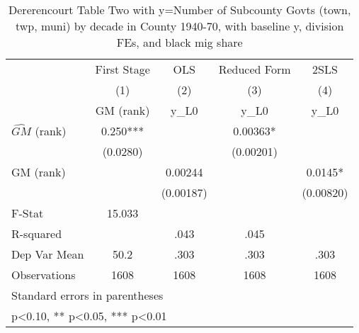 \begin{table}[htbp]\centering
\def\sym#1{\ifmmode^{#1}\else\(^{#1}\)\fi}
\caption{Dererencourt Table Two with y=Number of Subcounty Govts (town, twp, muni) by decade in County 1940-70, with baseline y, division FEs, and black mig share}
\begin{tabular}{l*{4}{c}}
\toprule
                    & First Stage   &         OLS   &Reduced Form   &        2SLS   \\
                    &\multicolumn{1}{c}{(1)}&\multicolumn{1}{c}{(2)}&\multicolumn{1}{c}{(3)}&\multicolumn{1}{c}{(4)}\\
                    &\multicolumn{1}{c}{GM  (rank)}&\multicolumn{1}{c}{y\_L0}&\multicolumn{1}{c}{y\_L0}&\multicolumn{1}{c}{y\_L0}\\
\midrule
$\hat{GM}$ (rank)   &       0.250***&               &     0.00363*  &               \\
                    &    (0.0280)   &               &   (0.00201)   &               \\
\addlinespace
GM  (rank)          &               &     0.00244   &               &      0.0145*  \\
                    &               &   (0.00187)   &               &   (0.00820)   \\
\midrule
F-Stat              &      15.033   &               &               &               \\
R-squared           &               &        .043   &        .045   &               \\
Dep Var Mean        &        50.2   &        .303   &        .303   &        .303   \\
Observations        &        1608   &        1608   &        1608   &        1608   \\
\bottomrule
\multicolumn{5}{l}{\footnotesize Standard errors in parentheses}\\
\multicolumn{5}{l}{\footnotesize * p<0.10, ** p<0.05, *** p<0.01}\\
\end{tabular}
\end{table}
